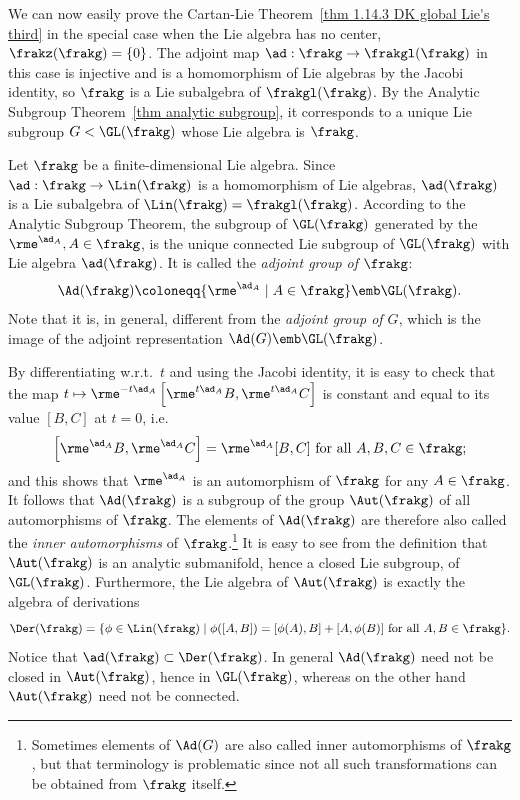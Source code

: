 \begin{example}
    We can now easily prove the Cartan-Lie Theorem~\ref{thm 1.14.3 DK global Lie's third} in the special case when the Lie algebra has no center, $\frakz(\frakg)=\{0\}$. The adjoint map $\ad:\frakg\to \frakgl(\frakg)$ in this case is injective and is a homomorphism of Lie algebras by the Jacobi identity, so $\frakg$ is a Lie subalgebra of $\frakgl(\frakg)$. By the Analytic Subgroup Theorem~\ref{thm analytic subgroup}, it corresponds to a unique Lie subgroup $G<\GL(\frakg)$ whose Lie algebra is $\frakg$.
\end{example}


\begin{example}\label{ex adjoint group}
    Let $\frakg$ be a finite-dimensional Lie algebra. Since $\ad:\frakg\to \Lin(\frakg)$ is a homomorphism of Lie algebras, $\ad(\frakg)$ is a Lie subalgebra of $\Lin(\frakg)=\frakgl(\frakg)$. According to the Analytic Subgroup Theorem, the subgroup of $\GL(\frakg)$ generated by the $\rme^{\ad_A}, A\in\frakg$, is the unique connected Lie subgroup of $\GL(\frakg)$ with Lie algebra $\ad(\frakg)$. It is called the \emph{adjoint group of $\frakg$}:
    \[\Ad(\frakg)\coloneqq \{\rme^{\ad_A}\mid A\in\frakg\}\emb \GL(\frakg).\]
    Note that it is, in general, different from the \emph{adjoint group of $G$}, which is the image of the adjoint representation $\Ad (G)\emb \GL(\frakg)$.
    
    By differentiating w.r.t.\ $t$ and using the Jacobi identity, it is easy to check that the map $t\mapsto \rme^{-t\ad_A}\left[\rme^{t\ad_A}B,\rme^{t\ad_A}C\right]$ is constant and equal to its value $[B,C]$ at $t=0$, i.e.
    \[\left[\rme^{\ad_A}B,\rme^{\ad_A}C\right]=\rme^{\ad_A}[B,C] \text{ for all }A,B,C\in\frakg;\]
    and this shows that $\rme^{\ad_A}$ is an automorphism of $\frakg$ for any $A\in\frakg$. It follows that $\Ad(\frakg)$ is a subgroup of the group $\Aut(\frakg)$ of all automorphisms of $\frakg$. The elements of $\Ad(\frakg)$ are therefore also called the \emph{inner automorphisms} of $\frakg$.\footnote{Sometimes elements of $\Ad(G)$ are also called inner automorphisms of $\frakg$, but that terminology is problematic since not all such transformations can be obtained from $\frakg$ itself.} It is easy to see from the definition that $\Aut(\frakg)$ is an analytic submanifold, hence a closed Lie subgroup, of $\GL(\frakg)$. Furthermore, the Lie algebra of $\Aut(\frakg)$ is exactly the algebra of derivations
    \[\Der(\frakg)=\{\phi\in \Lin(\frakg)\mid \phi ([A,B])=[\phi(A),B]+[A,\phi(B)]\text{ for all }A,B\in\frakg\}.\]
    Notice that $\ad(\frakg)\subset \Der(\frakg)$. In general $\Ad(\frakg)$ need not be closed in $\Aut(\frakg)$, hence in $\GL(\frakg)$, whereas on the other hand $\Aut(\frakg)$ need not be connected.


\end{example}
